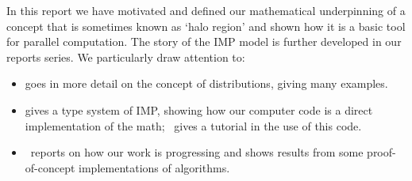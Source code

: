 \documentclass[11pt,fleqn,preprint]{impreport}
\begin{document}
In this report we have motivated and defined our mathematical
underpinning of a concept that is sometimes known as `halo region' and
shown how it is a basic tool for parallel computation. The story of
the IMP model is further developed in our reports series. We
particularly draw attention to:
\begin{itemize}
\item \cite{IMP-01} goes in more detail on the concept of
  distributions, giving many examples.
\item \cite{IMP-03} gives a type system of IMP, showing how our computer code
  is a direct implementation of the math; \cite{IMP-18}~gives a
  tutorial in the use of this code.
\item \cite{IMP-19}~reports on how our work is progressing and shows
  results from some proof-of-concept implementations of algorithms.
\end{itemize}





\end{document}
